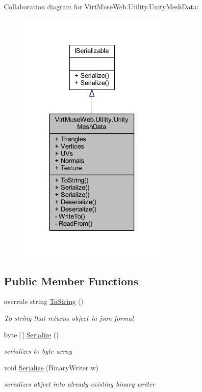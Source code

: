Collaboration diagram for Virt\+Muse\+Web.\+Utility.\+Unity\+Mesh\+Data\+:
\nopagebreak
\begin{figure}[H]
\begin{center}
\leavevmode
\includegraphics[width=209pt]{class_virt_muse_web_1_1_utility_1_1_unity_mesh_data__coll__graph}
\end{center}
\end{figure}
\subsection*{Public Member Functions}
\begin{DoxyCompactItemize}
\item 
override string \mbox{\hyperlink{class_virt_muse_web_1_1_utility_1_1_unity_mesh_data_a75d6a8e007b7f5feaac4b550ac5eb67b}{To\+String}} ()
\begin{DoxyCompactList}\small\item\em To string that returns object in json format \end{DoxyCompactList}\item 
byte \mbox{[}$\,$\mbox{]} \mbox{\hyperlink{class_virt_muse_web_1_1_utility_1_1_unity_mesh_data_aecb9b3e9ca6cb88d5126e228982b4e06}{Serialize}} ()
\begin{DoxyCompactList}\small\item\em serializes to byte array \end{DoxyCompactList}\item 
void \mbox{\hyperlink{class_virt_muse_web_1_1_utility_1_1_unity_mesh_data_ae1ccde7727b2551f950ce046499774f2}{Serialize}} (Binary\+Writer w)
\begin{DoxyCompactList}\small\item\em serializes object into already existing binary writer \end{DoxyCompactList}\end{DoxyCompactItemize}
